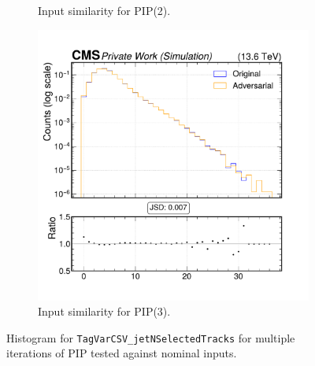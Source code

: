 \begin{figure}[h]
\begin{subfigure}[t]{0.32\textwidth}
    \caption{Input similarity for PIP(2).}
  \end{subfigure}\hfill
  \begin{subfigure}[t]{0.32\textwidth}
    \includegraphics[width=\linewidth]{media/output/features/compare/intprob_3/cmp_global_features_TagVarCSV_jetNSelectedTracks.pdf}
    \caption{Input similarity for PIP(3).}
  \end{subfigure}

  \caption{Histogram for \texttt{TagVarCSV\_jetNSelectedTracks} for multiple iterations of PIP tested against nominal inputs.}
  \label{fig:intprob_input_TagVarCSV_jetNSelectedTracks}
\end{figure}
